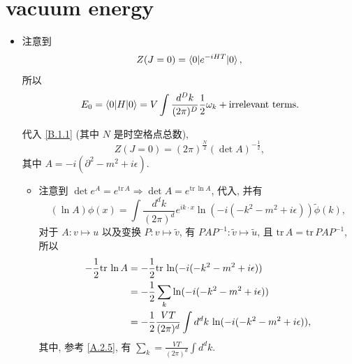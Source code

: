 \section{vacuum energy} \label{1.4}
\begin{itemize}
	\item 注意到
	\begin{equation} \label{1.4.1}
		Z(J = 0) = \braket{0 | e^{- i H T} | 0},
	\end{equation}
	所以
	\begin{equation}
		E_0 = \braket{0 | H | 0} = V \int \frac{d^D k}{(2 \pi)^D} \frac{1}{2} \omega_k + \text{irrelevant terms}.
	\end{equation}
	
	\begin{tcolorbox}[title=calculation:]
		代入 \eqref{B.1.1} (其中 $N$ 是时空格点总数),
		\begin{equation}
			Z(J = 0) = (2 \pi)^{\frac{N}{2}} (\det A)^{- \frac{1}{2}},
		\end{equation}
		其中 $A = - i (\partial^2 - m^2 + i \epsilon)$.
		\begin{itemize}
			\item 注意到 $\det e^A = e^{\mathrm{tr} \, A} \Longrightarrow \det A = e^{\mathrm{tr} \, \ln A}$, 代入, 并有
			\begin{equation}
				(\ln A) \phi(x) = \int \frac{d^d k}{(2 \pi)^d} e^{i k \cdot x} \ln(- i (- k^2 - m^2 + i \epsilon)) \tilde{\phi}(k),
			\end{equation}
			对于 $A : v \mapsto u$ 以及变换 $P : v \mapsto \tilde{v}$, 有 $P A P^{- 1} : \tilde{v} \mapsto \tilde{u}$, 且 $\mathrm{tr} \, A = \mathrm{tr} \, P A P^{- 1}$, 所以
			\begin{align}
				- \frac{1}{2} \mathrm{tr} \, \ln A &= - \frac{1}{2} \mathrm{tr} \, \ln(- i (- k^2 - m^2 + i \epsilon)) \notag \\
				&= - \frac{1}{2} \sum_k \ln(- i (- k^2 - m^2 + i \epsilon)) \notag \\
				&= - \frac{1}{2} \frac{V T}{(2 \pi)^d} \int d^d k \, \ln(- i (- k^2 - m^2 + i \epsilon)),
			\end{align}
			其中, 参考 \eqref{A.2.5}, 有 $\sum_k = \frac{V T}{(2 \pi)^d} \int d^d k$.
		\end{itemize}
		

\end{tcolorbox}
\end{itemize}
